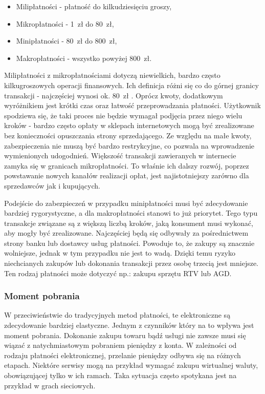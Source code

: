\begin{itemize}
	\item Milipłatności - płatność do kilkudziesięciu groszy,
	\item Mikropłatności - 1~zł do 80~zł,
	\item Minipłatności - 80~zł do 800~zł,
	\item Makropłatności - wszystko powyżej 800~zł. 
\end{itemize}

Milipłatności z mikropłatnościami dotyczą niewielkich, bardzo często 
kilkugroszowych operacji finansowych. Ich definicja różni się co do górnej 
granicy transakcji - najczęściej wynosi ok. 80~zł 
\cite{rodzaje_platnosci}\cite{elektroniczne_metody_platnosci}. Oprócz kwoty, 
dodatkowym wyróżnikiem jest krótki czas oraz łatwość przeprowadzania 
płatności. Użytkownik spodziewa się, że taki proces nie będzie wymagał podjęcia 
przez niego wielu kroków - bardzo często opłaty w sklepach internetowych mogą 
być zrealizowane bez konieczności opuszczania strony sprzedającego. Ze względu 
na małe kwoty, zabezpieczenia nie muszą być bardzo restrykcyjne, co pozwala na 
wprowadzenie wymienionych udogodnień. Większość transakcji zawieranych w 
internecie zamyka się w granicach mikropłatności. To właśnie ich dalszy rozwój, 
poprzez powstawanie nowych kanałów realizacji opłat, jest najistotniejszy 
zarówno dla sprzedawców jak i kupujących.

Podejście do zabezpieczeń w przypadku minipłatności musi być zdecydowanie 
bardziej rygorystyczne, a dla makropłatności stanowi to już priorytet. Tego 
typu transakcje związane są z większą liczbą kroków, jaką konsument musi 
wykonać, aby mogły być zrealizowane. Najczęściej będą się odbywały za 
pośrednictwem strony banku lub dostawcy usług płatności. Powoduje to, że zakupy 
są znacznie wolniejsze, jednak w tym przypadku nie jest to wadą. Dzięki  temu 
ryzyko niechcianych zakupów lub dokonania transakcji przez osobę trzecią jest 
mniejsze. Ten rodzaj płatności może dotyczyć np.: zakupu sprzętu RTV lub AGD.

\subsubsection*{Moment pobrania}

W przeciwieństwie do tradycyjnych metod płatności, te elektroniczne są zdecydowanie bardziej elastyczne. Jednym z czynników który na to wpływa jest  moment pobrania. 
Dokonanie zakupu towaru bądź usługi nie zawsze musi się wiązać z 
natychmiastowym pobraniem pieniędzy z konta. W zależności od rodzaju płatności 
elektronicznej, przelanie pieniędzy odbywa się na różnych etapach. Niektóre 
serwisy mogą na przykład wymagać zakupu wirtualnej waluty, obowiązującej tylko 
w ich ramach. Taka sytuacja często spotykana jest na przykład w grach sieciowych. 

